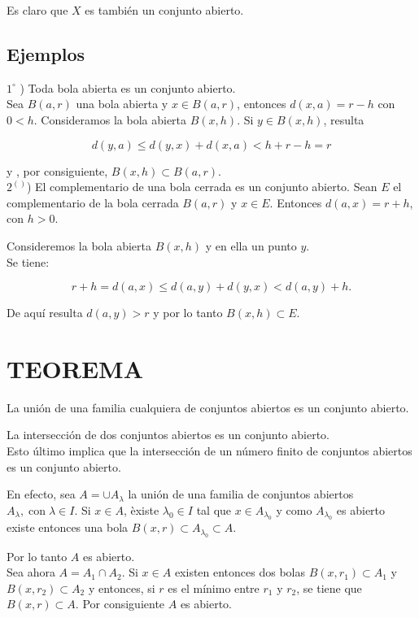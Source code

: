 \documentclass[10pt]{article}
\theoremstyle{plain}
\theoremstyle{definition}
\theoremstyle{remark}
\begin{document}
Es claro que $X$ es también un conjunto abierto.

\subsection{Ejemplos}
$1^{\circ}$ ) Toda bola abierta es un conjunto abierto.\\
Sea $B(a, r)$ una bola abierta y $x \in B(a, r)$, entonces $d(x, a)=r-h$ con $0<h$. Consideramos la bola abierta $B(x, h)$. Si $y \in B(x, h)$, resulta

$$
d(y, a) \leqslant d(y, x)+d(x, a)<h+r-h=r
$$

y , por consiguiente, $B(x, h) \subset B(a, r)$.\\
$2^{()}$) El complementario de una bola cerrada es un conjunto abierto. Sean $E$ el complementario de la bola cerrada $B(a, r)$ y $x \in E$. Entonces $d(a, x)=r+h$, con $h>0$.

Consideremos la bola abierta $B(x, h)$ y en ella un punto $y$.\\
Se tiene:

$$
r+h=d(a, x) \leqslant d(a, y)+d(y, x)<d(a, y)+h .
$$

De aquí resulta $d(a, y)>r$ y por lo tanto $B(x, h) \subset E$.

\section*{TEOREMA}
La unión de una familia cualquiera de conjuntos abiertos es un conjunto abierto.

La intersección de dos conjuntos abiertos es un conjunto abierto.\\
Esto último implica que la intersección de un número finito de conjuntos abiertos es un conjunto abierto.

En efecto, sea $A=\cup A_{\lambda}$ la unión de una familia de conjuntos abiertos $A_{\lambda}, \operatorname{con} \lambda \in I$. Si $x \in A$, èxiste $\lambda_{0} \in I$ tal que $x \in A_{\lambda_{0}}$ y como $A_{\lambda_{0}}$ es abierto existe entonces una bola $B(x, r) \subset A_{\lambda_{0}} \subset A$.

Por lo tanto $A$ es abierto.\\
Sea ahora $A=A_{1} \cap A_{2}$. Si $x \in A$ existen entonces dos bolas $B\left(x, r_{1}\right) \subset A_{1}$ y $B\left(x, r_{2}\right) \subset A_{2}$ y entonces, si $r$ es el mínimo entre $r_{1}$ y $r_{2}$, se tiene que $B(x, r) \subset A$. Por consiguiente $A$ es abierto.
\end{document}
